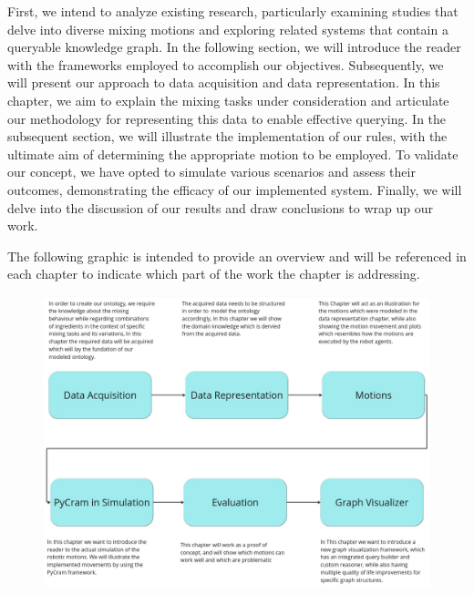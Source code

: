 First, we intend to analyze existing research, particularly examining studies that delve into diverse mixing motions and exploring related systems that contain a queryable knowledge graph.
In the following section, we will introduce the reader with the frameworks employed to accomplish our objectives.	
Subsequently, we will present our approach to data acquisition and data representation.
In this chapter, we aim to explain the mixing tasks under consideration and articulate our methodology for representing this data to enable effective querying.
In the subsequent section, we will illustrate the implementation of our rules, with the ultimate aim of determining the appropriate motion to be employed.
To validate our concept, we have opted to simulate various scenarios and assess their outcomes, demonstrating the efficacy of our implemented system.
Finally, we will delve into the discussion of our results and draw conclusions to wrap up our work.

The following graphic is intended to provide an overview and will be referenced in each chapter to indicate which part of the work the chapter is addressing.
\begin{figure}[H]
    \includegraphics[scale=0.36]{Graphics/overview.jpg}
\end{figure}